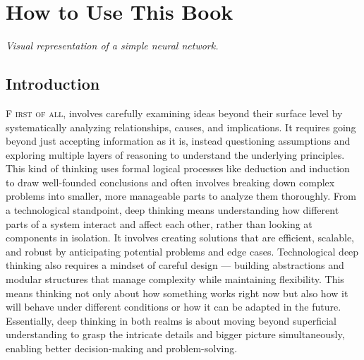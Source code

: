 \documentclass{book}
\begin{document}
\chapter{How to Use This Book}

\begin{center}

\vspace{0.5cm}
{\itshape Visual representation of a simple neural network.}
\end{center}

\section{Introduction}
\lettrine{F}{ irst of all}, involves carefully examining ideas beyond their surface level by systematically analyzing relationships, causes, and implications. It requires going beyond just accepting information as it is, instead questioning assumptions and exploring multiple layers of reasoning to understand the underlying principles. This kind of thinking uses formal logical processes like deduction and induction to draw well-founded conclusions and often involves breaking down complex problems into smaller, more manageable parts to analyze them thoroughly. From a technological standpoint, deep thinking means understanding how different parts of a system interact and affect each other, rather than looking at components in isolation. It involves creating solutions that are efficient, scalable, and robust by anticipating potential problems and edge cases. Technological deep thinking also requires a mindset of careful design — building abstractions and modular structures that manage complexity while maintaining flexibility. This means thinking not only about how something works right now but also how it will behave under different conditions or how it can be adapted in the future. Essentially, deep thinking in both realms is about moving beyond superficial understanding to grasp the intricate details and bigger picture simultaneously, enabling better decision-making and problem-solving.
\end{document}
